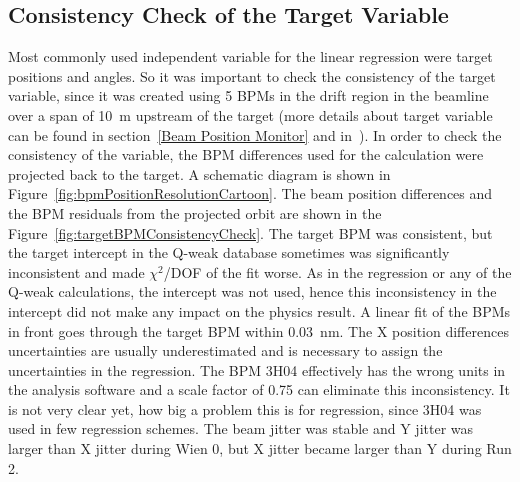 %
%

\subsection{Consistency Check of the Target Variable}
\label{Consistency Check of the Target Variable }

Most commonly used independent variable for the linear regression were target positions and angles. So it was important to check the consistency of the target variable, since it was created using 5 BPMs in the drift region in the beamline over a span of 10~m upstream of the target (more details about target variable can be found in section~\ref{Beam Position Monitor} and in~\cite{nur_linear_reg, buddhini_qweak}). 
In order to check the consistency of the variable, the BPM differences used for the calculation were projected back to the target. A schematic diagram is shown in Figure~\ref{fig:bpmPositionResolutionCartoon}. The beam position differences and the BPM residuals from the projected orbit are shown in the Figure~\ref{fig:targetBPMConsistencyCheck}. The target BPM was consistent, but the target intercept in the Q-weak database sometimes was significantly inconsistent and made $\chi^{2}$/DOF of the fit worse. As in the regression or any of the Q-weak calculations, the intercept was not used, hence this inconsistency in the intercept did not make any impact on the physics result. A linear fit of the BPMs in front goes through the target BPM within 0.03~nm. The X position differences uncertainties are usually underestimated and is necessary to assign the uncertainties in the regression. The BPM 3H04 effectively has the wrong units in the analysis software and a scale factor of 0.75 can eliminate this inconsistency. It is not very clear yet, how big a problem this is for regression, since 3H04 was used in few regression schemes. The beam jitter was stable and Y jitter was larger than X jitter during Wien 0, but X jitter became larger than Y during Run 2. 

